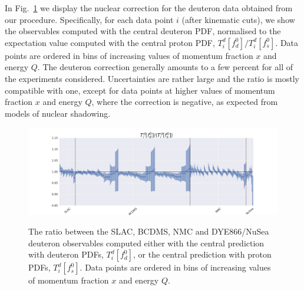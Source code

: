 \documentclass[11pt,a4paper]{article}
\begin{document}
In Fig.~\ref{fig:ratio} we display the nuclear correction for the deuteron data
obtained from our procedure. Specifically, for each data point $i$ (after
kinematic cuts), we show the observables computed with the central deuteron PDF,
normalised to the expectation value computed with the central proton PDF,
$T_i^d[f^0_d]/ T_i^d[f^0_s]$. Data points are ordered in bins of
increasing values of momentum fraction $x$ and energy $Q$. The deuteron
correction generally amounts to a few percent for all of the
experiments considered. Uncertainties are rather large and the
ratio is mostly compatible with one, except for data points at higher values
of momentum fraction $x$ and energy $Q$, where the correction is negative, as 
expected from models of nuclear shadowing.

\begin{figure}[!t]
  \centering
  \includegraphics[width=\linewidth,clip=true,trim=4cm 0 4cm 0]{plots/observable_ratio_ite_1}\\
  \caption{The ratio between the SLAC, BCDMS, NMC and DYE866/NuSea deuteron
    observables computed either with the central prediction with deuteron PDFs,
    $T_i^d[f^0_d]$, or the central prediction with proton PDFs, $T_i^d[f^0_s]$.
    Data points are ordered in bins of increasing values of momentum fraction
    $x$ and energy $Q$.}
  \label{fig:ratio}
\end{figure}
\end{document}
